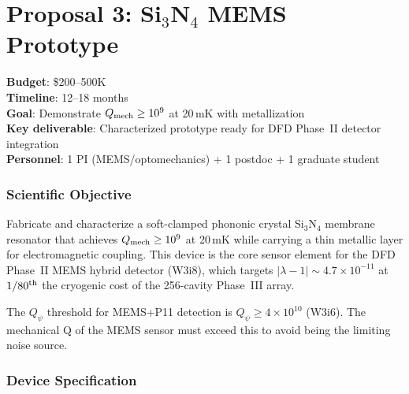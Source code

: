 \documentclass[11pt]{article}
\newcommand{\ee}[1]{\times 10^{#1}}
\newcommand{\lbone}{|\lambda - 1|}
\newcommand{\Qpsi}{Q_\psi}
\begin{document}
\newpage
\part{Proposal 3: Si$_3$N$_4$ MEMS Prototype}
\label{part:mems}

\begin{tcolorbox}[colback=green!3!white, colframe=actioncolor,
  title=\textbf{PROPOSAL 3 --- Si$_3$N$_4$ MEMS PROTOTYPE}]
\textbf{Budget}: \$200--500K\\
\textbf{Timeline}: 12--18 months\\
\textbf{Goal}: Demonstrate $Q_{\rm mech} \geq 10^9$ at 20\,mK
with metallization\\
\textbf{Key deliverable}: Characterized prototype ready for
DFD Phase~II detector integration\\
\textbf{Personnel}: 1 PI (MEMS/optomechanics) + 1 postdoc + 1
graduate student
\end{tcolorbox}

\section{Scientific Objective}

Fabricate and characterize a soft-clamped phononic crystal Si$_3$N$_4$
membrane resonator that achieves $Q_{\rm mech} \geq 10^9$ at 20\,mK
while carrying a thin metallic layer for electromagnetic coupling.
This device is the core sensor element for the DFD Phase~II MEMS
hybrid detector (W3i8), which targets $\lbone \sim 4.7\ee{-11}$ at
$1/80^{\rm th}$ the cryogenic cost of the 256-cavity Phase~III array.

The $\Qpsi$ threshold for MEMS+P11 detection is $\Qpsi \geq 4\ee{10}$
(W3i6). The mechanical Q of the MEMS sensor must exceed this to avoid
being the limiting noise source.

\section{Device Specification}
\end{document}

